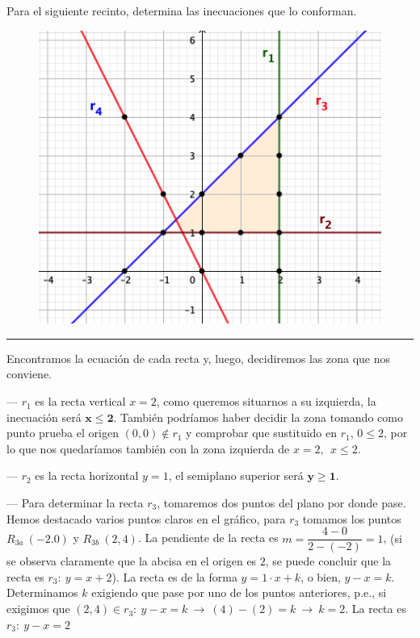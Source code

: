 \vspace{5mm}
\begin{miejercicio}

Para el siguiente recinto, determina las inecuaciones que lo conforman.


	\begin{figure}[H]
	\centering
	\includegraphics[width=.65\textwidth]{imagenes/img10.png}
\end{figure}

\rule{250pt}{0.1pt}

\vspace{4mm} Encontramos la ecuación de cada recta y, luego, decidiremos las zona que nos conviene.

\vspace{7mm}
--- $r_1$ es la recta vertical $x=2$, como queremos situarnos a su izquierda, la inecuación será $\boldsymbol{x\le 2}$. \textcolor{gris}{También podríamos haber decidir la zona tomando como punto prueba el origen $(0,0) \notin r_1$ y comprobar que sustituido en $r_1$, $0\le 2$, por lo que nos quedaríamos también con la zona izquierda de $x=2,\ \ x\le 2$.}



--- $r_2$ es la recta horizontal $y=1$, el semiplano superior será $\boldsymbol{y\ge 1}$.

\vspace{2mm} --- Para determinar la recta $r_3$, tomaremos dos puntos del plano por donde pase. Hemos destacado varios puntos claros en el gráfico, para $r_3$ tomamos los puntos $R_{3a}\ (-2.0)$ y  $R_{3b}\ (2,4)$. La pendiente de la recta es $m=	\dfrac{4-0}{2-(-2)}=1$, \textcolor{gris}{(si se observa claramente que la abcisa en el origen es $2$, se puede concluir que la recta es $r_3:\ y=x+2$)}. La recta es de la forma $y=1\cdot x + k$, o bien, $y-x=k$. Determinamos $k$ exigiendo que pase por uno de los puntos anteriores, p.e., si exigimos que $(2,4)\in r_3:\ y-x=k \ \to \ (4)-(2)=k \ \rightarrow \ k=2$. La recta es $r_3:\ y-x=2$


\end{miejercicio}
